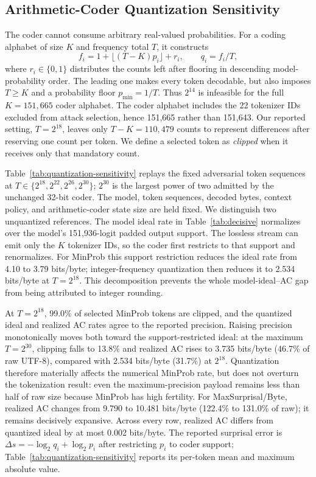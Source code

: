 \subsection{Arithmetic-Coder Quantization Sensitivity}
\label{app:quantization-sensitivity}
The coder cannot consume arbitrary real-valued probabilities. For a coding
alphabet of size $K$ and frequency total $T$, it constructs
\[
 f_i = 1 + \lfloor (T-K)p_i\rfloor + r_i, \qquad q_i=f_i/T,
\]
where $r_i\in\{0,1\}$ distributes the counts left after flooring in
descending model-probability order. The leading one makes every token
decodable, but also imposes $T\ge K$ and a probability floor
$p_{\min}=1/T$. Thus $2^{14}$ is infeasible for the full $K=151{,}665$
coder alphabet. The coder alphabet includes the 22 tokenizer IDs excluded from attack selection, hence 151{,}665 rather than 151{,}643. Our reported setting, $T=2^{18}$, leaves only $T-K=110{,}479$
counts to represent differences after reserving one count per token. We define a
selected token as \emph{clipped} when it receives only that mandatory count.

Table~\ref{tab:quantization-sensitivity} replays the fixed adversarial token
sequences at $T\in\{2^{18},2^{22},2^{26},2^{30}\}$; $2^{30}$ is the
largest power of two admitted by the unchanged 32-bit coder. The model, token
sequences, decoded bytes, context policy, and arithmetic-coder state size are
held fixed. We distinguish two unquantized references. The model ideal rate in
Table~\ref{tab:decisive} normalizes over the model's 151{,}936-logit padded output support.
The lossless stream can emit only the $K$ tokenizer IDs, so the coder first
restricts to that support and renormalizes. For MinProb this support restriction
reduces the ideal rate from 4.10 to 3.79 bits/byte; integer-frequency
quantization then reduces it to 2.534 bits/byte at $T=2^{18}$. This decomposition
prevents the whole model-ideal--AC gap from being attributed to integer rounding.

At $T=2^{18}$, 99.0\% of selected MinProb tokens are clipped, and the
quantized ideal and realized AC rates agree to the reported precision. Raising
precision monotonically moves both toward the support-restricted ideal: at the
maximum $T=2^{30}$, clipping falls to 13.8\% and realized AC rises to 3.735
bits/byte (46.7\% of raw UTF-8), compared with 2.534 bits/byte (31.7\%) at
$2^{18}$. Quantization therefore materially affects the numerical MinProb rate,
but does not overturn the tokenization result: even the maximum-precision
payload remains less than half of raw size because MinProb has high fertility.
For MaxSurprisal/Byte, realized AC changes from 9.790 to 10.481 bits/byte
(122.4\% to 131.0\% of raw); it remains decisively expansive. Across every
row, realized AC differs from quantized ideal by at most 0.002 bits/byte. The
reported surprisal error is $\Delta s=-\log_2q_i+\log_2p_i$ after
restricting $p_i$ to coder support; Table~\ref{tab:quantization-sensitivity}
reports its per-token mean and maximum absolute value.

